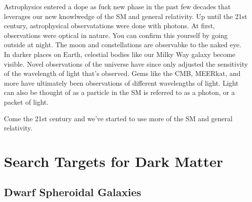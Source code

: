 Astrophysics entered a dope as fuck new phase in the past few decades that leverages our new knowlwedge of the SM and general relativity.
Up until the 21st century, astrophysical observatations were done with photons.
At first, observations were optical in nature.
You can confirm this yourself by going outside at night.
The moon and constellations are observabke to the naked eye.
In darker places on Earth, celestial bodies like our Milky Way galaxy become visible.
Novel observations of the universe have since only adjusted the sensitivity of the wavelength of light that's observed.
Gems like the CMB, MEERkat, \ns and more have ultimately been observations of different wavelengths of light.
Light can also be thought of as a particle in the SM is referred to as a photon, or a packet of light.

Come the 21st century and we've started to use more of the SM and general relativity.


\section{Search Targets for Dark Matter\label{sec:dm_targets}}

\subsection{Dwarf Spheroidal Galaxies\label{sec:dSphs}}
